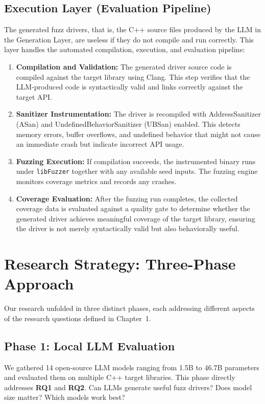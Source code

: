 \subsection{Execution Layer (Evaluation Pipeline)}
\label{sec:exec_layer}
The generated fuzz drivers, that is, the C++ source files produced by the LLM in the Generation Layer, are useless if they do not compile and run correctly. This layer handles the automated compilation, execution, and evaluation pipeline:
\begin{enumerate}
    \item \textbf{Compilation and Validation:} The generated driver source code is compiled against the target library using Clang. This step verifies that the LLM-produced code is syntactically valid and links correctly against the target API.
    \item \textbf{Sanitizer Instrumentation:} The driver is recompiled with AddressSanitizer (ASan) and UndefinedBehaviorSanitizer (UBSan) enabled. This detects memory errors, buffer overflows, and undefined behavior that might not cause an immediate crash but indicate incorrect API usage.
    \item \textbf{Fuzzing Execution:} If compilation succeeds, the instrumented binary runs under \texttt{libFuzzer} together with any available seed inputs. The fuzzing engine monitors coverage metrics and records any crashes.
    \item \textbf{Coverage Evaluation:} After the fuzzing run completes, the collected coverage data is evaluated against a quality gate to determine whether the generated driver achieves meaningful coverage of the target library, ensuring the driver is not merely syntactically valid but also behaviorally useful.
\end{enumerate}

\section{Research Strategy: Three-Phase Approach}
\label{sec:meth_strategy}

Our research unfolded in three distinct phases, each addressing different aspects of the research questions defined in Chapter~1.

\subsection{Phase 1: Local LLM Evaluation}
We gathered 14 open-source LLM models ranging from 1.5B to 46.7B parameters and evaluated them on multiple C++ target libraries. This phase directly addresses \textbf{RQ1} and \textbf{RQ2}. Can LLMs generate useful fuzz drivers? Does model size matter? Which models work best?

